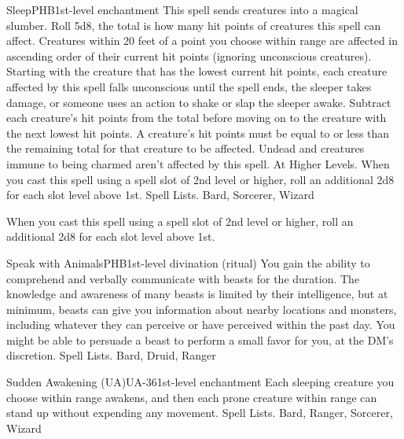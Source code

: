 \begin{spell}{Sleep}{PHB}{1st-level enchantment}
{
}
This spell sends creatures into a magical slumber. Roll 5d8, the total is how many hit points of creatures this spell can affect. Creatures within 20 feet of a point you choose within range are affected in ascending order of their current hit points (ignoring unconscious creatures).
Starting with the creature that has the lowest current hit points, each creature affected by this spell falls unconscious until the spell ends, the sleeper takes damage, or someone uses an action to shake or slap the sleeper awake. Subtract each creature’s hit points from the total before moving on to the creature with the next lowest hit points. A creature’s hit points must be equal to or less than the remaining total for that creature to be affected. Undead and creatures immune to being charmed aren’t affected by this spell.
At Higher Levels. When you cast this spell using a spell slot of 2nd level or higher, roll an additional 2d8 for each slot level above 1st.
Spell Lists. Bard, Sorcerer, Wizard

 When you cast this spell using a spell slot of 2nd level or higher, roll an additional 2d8 for each slot level above 1st.
\end{spell}

\begin{spell}{Speak with Animals}{PHB}{1st-level divination (ritual)}
{
}
You gain the ability to comprehend and verbally communicate with beasts for the duration. The knowledge and awareness of many beasts is limited by their intelligence, but at minimum, beasts can give you information about nearby locations and monsters, including whatever they can perceive or have perceived within the past day. You might be able to persuade a beast to perform a small favor for you, at the DM’s discretion.
Spell Lists. Bard, Druid, Ranger
\end{spell}

\begin{spell}{Sudden Awakening (UA)}{UA-36}{1st-level enchantment}
{
}
Each sleeping creature you choose within range awakens, and then each prone creature within range can stand up without expending any movement.
Spell Lists. Bard, Ranger, Sorcerer, Wizard
\end{spell}

